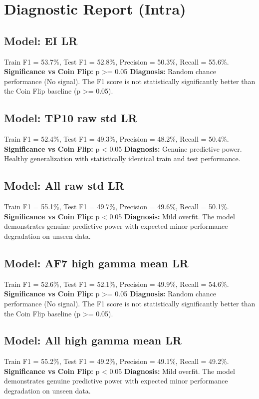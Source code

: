 \section*{Diagnostic Report (Intra)}
\subsection*{Model: EI LR}
Train F1 = 53.7\%, Test F1 = 52.8\%, Precision = 50.3\%, Recall = 55.6\%.
\newline
\textbf{Significance vs Coin Flip:} p >= 0.05
\newline
\textbf{Diagnosis:} Random chance performance (No signal). The F1 score is not statistically significantly better than the Coin Flip baseline (p >= 0.05).

\subsection*{Model: TP10 raw std LR}
Train F1 = 52.4\%, Test F1 = 49.3\%, Precision = 48.2\%, Recall = 50.4\%.
\newline
\textbf{Significance vs Coin Flip:} p < 0.05
\newline
\textbf{Diagnosis:} Genuine predictive power. Healthy generalization with statistically identical train and test performance.

\subsection*{Model: All raw std LR}
Train F1 = 55.1\%, Test F1 = 49.7\%, Precision = 49.6\%, Recall = 50.1\%.
\newline
\textbf{Significance vs Coin Flip:} p < 0.05
\newline
\textbf{Diagnosis:} Mild overfit. The model demonstrates genuine predictive power with expected minor performance degradation on unseen data.

\subsection*{Model: AF7 high gamma mean LR}
Train F1 = 52.6\%, Test F1 = 52.1\%, Precision = 49.9\%, Recall = 54.6\%.
\newline
\textbf{Significance vs Coin Flip:} p >= 0.05
\newline
\textbf{Diagnosis:} Random chance performance (No signal). The F1 score is not statistically significantly better than the Coin Flip baseline (p >= 0.05).

\subsection*{Model: All high gamma mean LR}
Train F1 = 55.2\%, Test F1 = 49.2\%, Precision = 49.1\%, Recall = 49.2\%.
\newline
\textbf{Significance vs Coin Flip:} p < 0.05
\newline
\textbf{Diagnosis:} Mild overfit. The model demonstrates genuine predictive power with expected minor performance degradation on unseen data.
